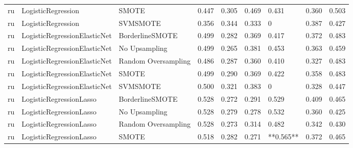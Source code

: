 \begin{tabular}{lllllllll}
      ru &              LogisticRegression &                         SMOTE & 0.447 &                     0.305 &                 0.469 &                  0.431 &                                   0.360 &     0.503 \\
      ru &              LogisticRegression &                      SVMSMOTE & 0.356 &                     0.344 &                 0.333 &                      0 &                                   0.387 &     0.427 \\
      ru &    LogisticRegressionElasticNet &               BorderlineSMOTE & 0.499 &                     0.282 &                 0.369 &                  0.417 &                                   0.372 &     0.483 \\
      ru &    LogisticRegressionElasticNet &                 No Upsampling & 0.499 &                     0.265 &                 0.381 &                  0.453 &                                   0.363 &     0.459 \\
      ru &    LogisticRegressionElasticNet &           Random Oversampling & 0.486 &                     0.287 &                 0.360 &                  0.410 &                                   0.327 &     0.483 \\
      ru &    LogisticRegressionElasticNet &                         SMOTE & 0.499 &                     0.290 &                 0.369 &                  0.422 &                                   0.358 &     0.483 \\
      ru &    LogisticRegressionElasticNet &                      SVMSMOTE & 0.500 &                     0.321 &                 0.383 &                      0 &                                   0.328 &     0.447 \\
      ru &         LogisticRegressionLasso &               BorderlineSMOTE & 0.528 &                     0.272 &                 0.291 &                  0.529 &                                   0.409 &     0.465 \\
      ru &         LogisticRegressionLasso &                 No Upsampling & 0.528 &                     0.279 &                 0.278 &                  0.532 &                                   0.360 &     0.425 \\
      ru &         LogisticRegressionLasso &           Random Oversampling & 0.528 &                     0.273 &                 0.314 &                  0.482 &                                   0.342 &     0.430 \\
      ru &         LogisticRegressionLasso &                         SMOTE & 0.518 &                     0.282 &                 0.271 &              **0.565** &                                   0.372 &     0.465 \\

\end{tabular}
